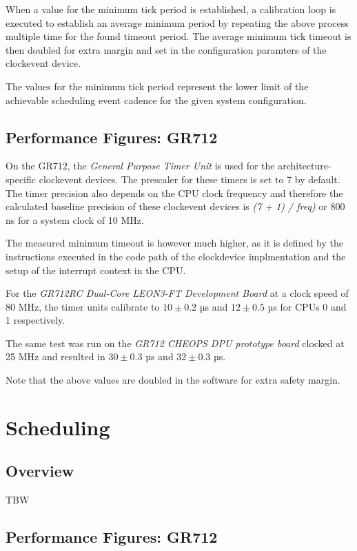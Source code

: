 When a value for the minimum tick period is established, a calibration loop
is executed to establish an average minimum period by repeating the
above process multiple time for the found timeout period. The average
minimum tick timeout is then doubled for extra margin and set in the
configuration paramters of the clockevent device.

The values for the minimum tick period represent the lower limit of the
achievable scheduling event cadence for the given system configuration.


\section{Performance Figures: GR712}

On the GR712, the \emph{General Purpose Timer Unit}\cite{GR712UM} is used for
the architecture-specific clockevent devices. The prescaler for these timers
is set to 7 by default. The timer precision also depends on the CPU clock
frequency and therefore the calculated baseline precision of these clockevent
devices is \emph{ (7 + 1) / freq)} or 800 ns for a system clock of 10 MHz.

The measured minimum timeout is however much higher, as it is defined by the
instructions executed in the code path of the clockdevice implmentation and the
setup of the interrupt context in the CPU.

For the \emph{GR712RC Dual-Core LEON3-FT Development Board} at a clock speed of
80 MHz, the timer units calibrate to $10 \pm 0.2$ µs and $12 \pm 0.5$ µs for
CPUs 0 and 1 respectively.

The same test was run on the \emph{GR712 CHEOPS DPU prototype board} clocked
at 25 MHz and resulted in $30\pm 0.3$ µs and $32 \pm 0.3$ µs.

Note that the above values are doubled in the software for extra safety margin.


\chapter{Scheduling}

\section{Overview}

TBW


\section{Performance Figures: GR712}

